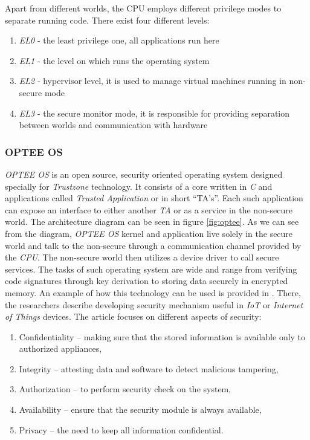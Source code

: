  Apart from different worlds, the CPU employs different privilege modes to separate running code. There exist four different levels:
\begin{enumerate}
    \item \textit{EL0} - the least privilege one, all applications run here
    \item \textit{EL1} - the level on which runs the operating system
    \item \textit{EL2} - hypervisor level, it is used to manage virtual machines running in non-secure mode
    \item \textit{EL3} - the secure monitor mode, it is responsible for providing separation between worlds and communication with hardware
\end{enumerate}

\subsubsection{OPTEE OS}
\textit{OPTEE OS} is an open source, security oriented operating system designed specially for \textit{Trustzone} technology. It consists of a core written in \textit{C} and applications called \textit{Trusted Application} or in short “TA's”. Each such application can expose an interface to either another \textit{TA} or as a service in the non-secure world. The architecture diagram can be seen in figure \ref{fig:optee}. As we can see from the diagram, \textit{OPTEE OS} kernel and application live solely in the secure world and talk to the non-secure through a communication channel provided by the \textit{CPU}. The non-secure world then utilizes a device driver to call secure services. The tasks of such operating system are wide and range from verifying code signatures through key derivation to storing data securely in encrypted memory. An example of how this technology can be used is provided in \cite{opteeusage}. There, the researchers describe developing security mechanism useful in \textit{IoT} or \textit{Internet of Things} devices. The article focuses on different aspects of security:
\begin{enumerate}
    \item Confidentiality – making sure that the stored information is available only to authorized appliances, 
    \item Integrity – attesting data and software to detect malicious tampering,
    \item Authorization – to perform security check on the system,
    \item Availability – ensure that the security module is always available,
    \item Privacy – the need to keep all information confidential.
\end{enumerate}

